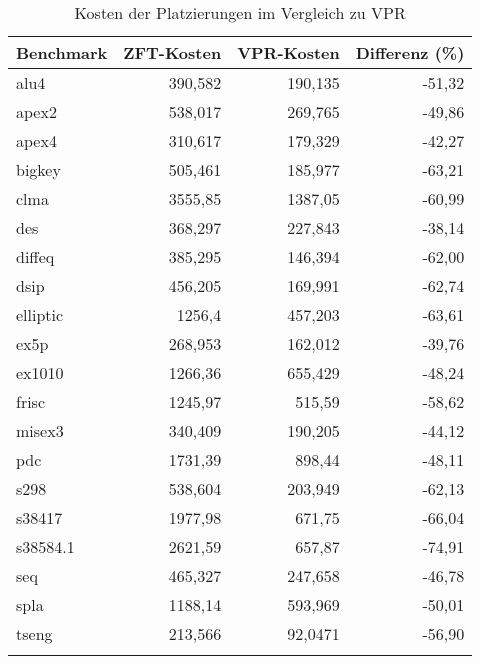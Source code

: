         \begin{center}
            \begin{longtable}{| l | r | r | r |}
                \hline
                \textbf{Benchmark}  & \textbf{ZFT-Kosten} & \textbf{VPR-Kosten} & \textbf{Differenz (\%)} \\
                \hline
                    alu4        &   390,582     &   190,135     &   -51,32 \\ \hline
                    apex2       &   538,017     &   269,765     &   -49,86 \\ \hline    
                    apex4       &   310,617     &   179,329     &   -42,27 \\ \hline        
                    bigkey      &   505,461     &   185,977     &   -63,21 \\ \hline        
                    clma        &   3555,85     &   1387,05     &   -60,99 \\ \hline        
                    des         &   368,297     &   227,843     &   -38,14 \\ \hline        
                    diffeq      &   385,295     &   146,394     &   -62,00 \\ \hline        
                    dsip        &   456,205     &   169,991     &   -62,74 \\ \hline        
                    elliptic    &   1256,4      &   457,203     &   -63,61 \\ \hline         
                    ex5p        &   268,953     &   162,012     &   -39,76 \\ \hline        
                    ex1010      &   1266,36     &   655,429     &   -48,24 \\ \hline        
                    frisc       &   1245,97     &   515,59      &   -58,62 \\ \hline        
                    misex3      &   340,409     &   190,205     &   -44,12 \\ \hline        
                    pdc         &   1731,39     &   898,44      &   -48,11 \\ \hline        
                    s298        &   538,604     &   203,949     &   -62,13 \\ \hline        
                    s38417      &   1977,98     &   671,75      &   -66,04 \\ \hline        
                    s38584.1    &   2621,59     &   657,87      &   -74,91 \\ \hline        
                    seq         &   465,327     &   247,658     &   -46,78 \\ \hline        
                    spla        &   1188,14     &   593,969     &   -50,01 \\ \hline        
                    tseng       &   213,566     &   92,0471     &   -56,90 \\ \hline        
                \caption{Kosten der Platzierungen im Vergleich zu VPR}
                \label{tab:costs}
            \end{longtable}
        \end{center}

